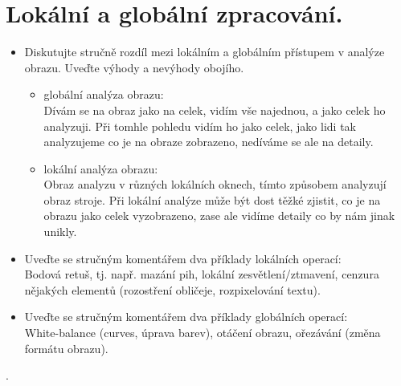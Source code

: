 \section{Lokální a globální zpracování.}
\begin{itemize}
  \item Diskutujte stručně rozdíl mezi lokálním a globálním přístupem v analýze obrazu. Uveďte výhody a nevýhody 
    obojího.
    \begin{itemize}
      \item{globální analýza obrazu:\\}
        Dívám se na obraz jako na celek, vidím vše najednou, a jako celek ho analyzuji.
        Při tomhle pohledu vidím ho jako celek, jako lidi tak analyzujeme co je na obraze zobrazeno, nedíváme se ale na detaily.
      \item{lokální analýza obrazu:\\}
        Obraz analyzu v různých lokálních oknech, tímto způsobem analyzují obraz stroje.
        Při lokální analýze může být dost těžké zjistit, co je na obrazu jako celek vyzobrazeno, zase ale vidíme detaily co by nám jinak unikly.
    \end{itemize}
  \item{Uveďte se stručným komentářem dva příklady lokálních operací:\footnotemark{}\\}
    Bodová retuš, tj. např. mazání pih, lokální zesvětlení/ztmavení, cenzura nějakých elementů (rozostření obličeje, rozpixelování textu).
  \item{Uveďte se stručným komentářem dva příklady globálních operací:\footnotemark[\value{footnote}]{}\\}
    White-balance (curves, úprava barev), otáčení obrazu, ořezávání (změna formátu obrazu).
\end{itemize}.
